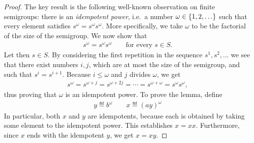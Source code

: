 \begin{proof} The key result is the following well-known observation on finite semigroups: there is an \emph{idempotent power}, i.e.~a number $\omega \in \{1,2,\ldots\}$ such that every element satisfies $s^\omega = s^\omega s^\omega$. 
More specifically, we take $\omega$ to be the factorial of the size of the semigroup. We now show that
\begin{align*}
  s^\omega = s^\omega s^\omega \qquad \text{for every }s \in S.
\end{align*}
Let then $s \in S$. By considering the first repetition in the sequence $s^1, s^2,\ldots$ we see that there exist numbers $i,j $, which  are at most the size of the semigroup, and such that $s^i = s^{i+1}$.
Because $i \le \omega$ and $j$ divides $\omega$, we get
\begin{align*}
  s^{\omega} = s^{\omega+j} = s^{\omega+2j} = \cdots = s^{\omega + \omega} = s^{\omega}s^{\omega},
\end{align*}
thus proving that $\omega$ is an idempotent power. To prove the lemma,  define
\begin{align*}
  y \eqdef b^{\omega}  \qquad x \eqdef  (ay)^{\omega}
\end{align*}
In particular, both $x$ and $y$ are idempotents, because each is obtained by taking some element to the idempotent power. This establishes $x = xx$. Furthermore, since $x$ ends with the idempotent $y$, we get $x = xy$.
\end{proof}


